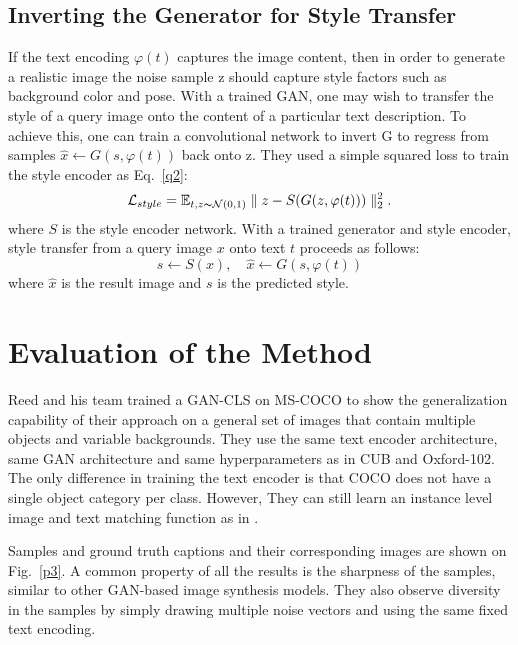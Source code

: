 \documentclass[10pt,twocolumn,letterpaper]{article}
\begin{document}
\subsection{Inverting the Generator for Style Transfer}

If the text encoding $\varphi(t)$ captures the image content, then in order to generate a realistic image the noise sample z should capture style factors such as background color and pose. With a trained GAN, one may wish to transfer the style of a query image onto the content of a particular text description. To achieve this, one can train a convolutional network to invert G to regress from samples $\hat{x}\gets G(s,\varphi(t))$ back onto z. They used a simple squared loss to train the style encoder as Eq.~\ref{q2}:
\begin{equation}
\mathcal{L}_{style}=\mathbb{E}_{t,z\thicksim \mathcal{N}(0,1)}\parallel z-S(G(z,\varphi(t))) \parallel_2^2.   \label{q2}
\end{equation}
where $S$ is the style encoder network. With a trained generator and style encoder, style transfer from a query image $x$ onto text $t$ proceeds as follows: 
\begin{equation}
s\gets S(x),\quad \hat{x}\gets G(s,\varphi(t))   \label{q3}
\end{equation}
where $\hat{x}$ is the result image and $s$ is the predicted style.


\section{Evaluation of the Method}

Reed and his team trained a GAN-CLS on MS-COCO to show the generalization capability of their approach on a general set of images that contain multiple objects and variable backgrounds. They use the same text encoder architecture, same GAN architecture and same hyperparameters as in CUB and Oxford-102. The only difference in training the text encoder is that COCO does not have a single object category per class. However, They can still learn an instance level image and text matching function as in \cite{kiros2014unifying}.

Samples and ground truth captions and their corresponding images are shown on Fig.~\ref{p3}. A common property of all the results is the sharpness of the samples, similar to other GAN-based image synthesis models. They also observe diversity in the samples by simply drawing multiple noise vectors and using the same fixed text encoding.

{\small


}
\end{document}
